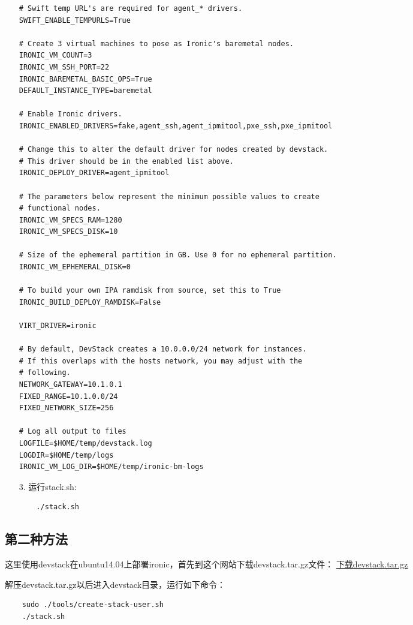 \documentclass[a4paper,left=1.5cm,right=1.5cm,11pt]{article}
\begin{document}
\begin{itemize}
\begin{lstlisting}
# Swift temp URL's are required for agent_* drivers.
SWIFT_ENABLE_TEMPURLS=True

# Create 3 virtual machines to pose as Ironic's baremetal nodes.
IRONIC_VM_COUNT=3
IRONIC_VM_SSH_PORT=22
IRONIC_BAREMETAL_BASIC_OPS=True
DEFAULT_INSTANCE_TYPE=baremetal

# Enable Ironic drivers.
IRONIC_ENABLED_DRIVERS=fake,agent_ssh,agent_ipmitool,pxe_ssh,pxe_ipmitool

# Change this to alter the default driver for nodes created by devstack.
# This driver should be in the enabled list above.
IRONIC_DEPLOY_DRIVER=agent_ipmitool

# The parameters below represent the minimum possible values to create
# functional nodes.
IRONIC_VM_SPECS_RAM=1280
IRONIC_VM_SPECS_DISK=10

# Size of the ephemeral partition in GB. Use 0 for no ephemeral partition.
IRONIC_VM_EPHEMERAL_DISK=0

# To build your own IPA ramdisk from source, set this to True
IRONIC_BUILD_DEPLOY_RAMDISK=False

VIRT_DRIVER=ironic

# By default, DevStack creates a 10.0.0.0/24 network for instances.
# If this overlaps with the hosts network, you may adjust with the
# following.
NETWORK_GATEWAY=10.1.0.1
FIXED_RANGE=10.1.0.0/24
FIXED_NETWORK_SIZE=256

# Log all output to files
LOGFILE=$HOME/temp/devstack.log
LOGDIR=$HOME/temp/logs
IRONIC_VM_LOG_DIR=$HOME/temp/ironic-bm-logs
		\end{lstlisting}

		\item[3.] 运行stack.sh:
		\begin{lstlisting}
	./stack.sh
		\end{lstlisting}
	\end{itemize}

\subsection{第二种方法}
	这里使用devstack在ubuntu14.04上部署ironic，首先到这个网站下载devstack.tar.gz文件：
	\href{https://github.com/wwtalwtaw/unix-life/blob/master/openstack/ironic/使用devstack部署ironic/devstack.tar.gz}{下载devstack.tar.gz}\par

	解压devstack.tar.gz以后进入devstack目录，运行如下命令：
	\begin{lstlisting}
	sudo ./tools/create-stack-user.sh
	./stack.sh
	\end{lstlisting}
\end{document}
